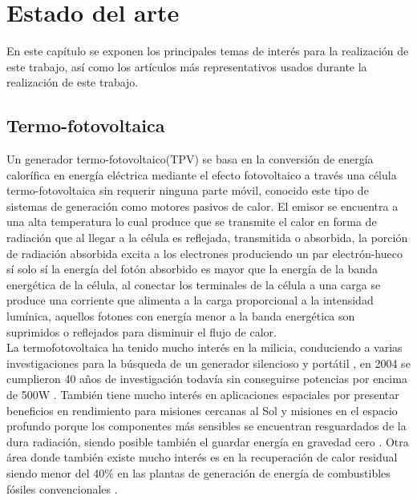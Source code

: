 \chapter{Estado del arte}


En este capítulo se exponen los principales temas de interés para la realización de este trabajo, así como los artículos más representativos usados durante la realización de este trabajo.
\section{Termo-fotovoltaica}
Un generador termo-fotovoltaico(TPV) se basa en la conversión de energía calorífica en energía eléctrica mediante el efecto fotovoltaico a través una célula termo-fotovoltaica sin requerir ninguna parte móvil, conocido este tipo de sistemas de generación como motores pasivos de calor. El emisor se encuentra a una alta temperatura lo cual produce que se transmite el calor en forma de radiación que al llegar a la célula es reflejada, transmitida o absorbida, la porción de radiación absorbida excita a los electrones produciendo un par electrón-hueco sí solo sí la energía del fotón absorbido es mayor que la energía de la banda energética de la célula, al conectar los terminales de la célula a una carga se produce una corriente que alimenta a la carga proporcional a la intensidad lumínica, aquellos fotones con energía menor a la banda energética son suprimidos o reflejados para disminuir el flujo de calor\cite{Present_Efficiencies_and_Future_Opportunities_in_Thermophotovoltaics}.\\

La termofotovoltaica ha tenido mucho interés en la milicia, conduciendo a varias investigaciones para la búsqueda de un generador silencioso y portátil \cite{military_TPV}, en 2004 se cumplieron 40 años de investigación todavía sin conseguirse potencias por encima de 500W \cite{military_TPV_40Years}. También tiene mucho interés en aplicaciones espaciales por presentar beneficios en rendimiento para misiones cercanas al Sol y misiones en el espacio profundo porque los componentes más sensibles se encuentran resguardados de la dura radiación, siendo posible también el guardar energía en gravedad cero \cite{TPV_space_applications}. Otra área donde también existe mucho interés es en la recuperación de calor residual siendo menor del 40\% en las plantas de generación de energía de combustibles fósiles convencionales \cite{wasteHeat_TPV}.\\

